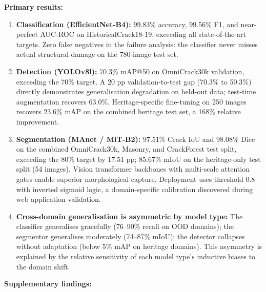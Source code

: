 \documentclass[12pt,a4paper]{article}
\begin{document}
\textbf{Primary results:}

\begin{enumerate}[leftmargin=1.5cm]
\item \textbf{Classification (EfficientNet-B4):} 99.83\% accuracy, 99.56\% F1, and near-perfect AUC-ROC on HistoricalCrack18-19, exceeding all state-of-the-art targets. Zero false negatives in the failure analysis: the classifier never misses actual structural damage on the 780-image test set.

\item \textbf{Detection (YOLOv8l):} 70.3\% mAP@50 on OmniCrack30k validation, exceeding the 70\% target. A 20 pp validation-to-test gap (70.3\% to 50.3\%) directly demonstrates generalisation degradation on held-out data; test-time augmentation recovers 63.0\%. Heritage-specific fine-tuning on 250 images recovers 23.6\% mAP on the combined heritage test set, a 168\% relative improvement.

\item \textbf{Segmentation (MAnet / MiT-B2):} 97.51\% Crack IoU and 98.08\% Dice on the combined OmniCrack30k, Masonry, and CrackForest test split, exceeding the 80\% target by 17.51 pp; 85.67\% mIoU on the heritage-only test split (54 images). Vision transformer backbones with multi-scale attention gates enable superior morphological capture. Deployment uses threshold 0.8 with inverted sigmoid logic, a domain-specific calibration discovered during web application validation.

\item \textbf{Cross-domain generalisation is asymmetric by model type:} The classifier generalises gracefully (76--90\% recall on OOD domains); the segmentor generalises moderately (74--87\% mIoU); the detector collapses without adaptation (below 5\% mAP on heritage domains). This asymmetry is explained by the relative sensitivity of each model type's inductive biases to the domain shift.
\end{enumerate}

\textbf{Supplementary findings:}
\end{document}
